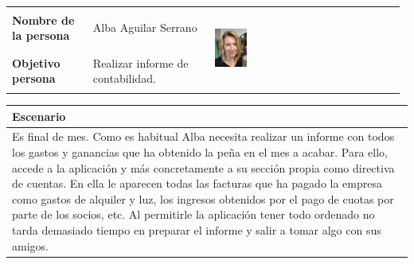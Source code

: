 \documentclass[11pt]{article}
\begin{document}
\begin{table}[H]
	\centering
	\begin{tabular}{p{0.2\linewidth}|p{0.3\linewidth}p{0.475\linewidth}}
		\toprule
		\textbf{Nombre de la persona} & Alba Aguilar Serrano &\multirow{2}{*}{\begin{minipage}{1.\textwidth}\includegraphics[width=0.18\textwidth, height=26mm]{Alba}\end{minipage}}\\
		\textbf{Objetivo persona} & Realizar informe de contabilidad. \\
		\bottomrule
	\end{tabular}
	
	\begin{tabular}{p{1.028\linewidth}}
		\textbf{Escenario}\\
		\midrule
		Es final de mes. Como es habitual Alba necesita realizar un informe con todos los gastos y ganancias que ha obtenido la peña en el mes a acabar. Para ello, accede a la aplicación y más concretamente a su sección propia como directiva de cuentas. En ella le aparecen todas las facturas que ha pagado la empresa como gastos de alquiler y luz, los ingresos obtenidos por el pago de cuotas por parte de los socios, etc. Al permitirle la aplicación tener todo ordenado no tarda demasiado tiempo en preparar el informe y salir a tomar algo con sus amigos.
	\end{tabular}
\end{table}
\end{document}
